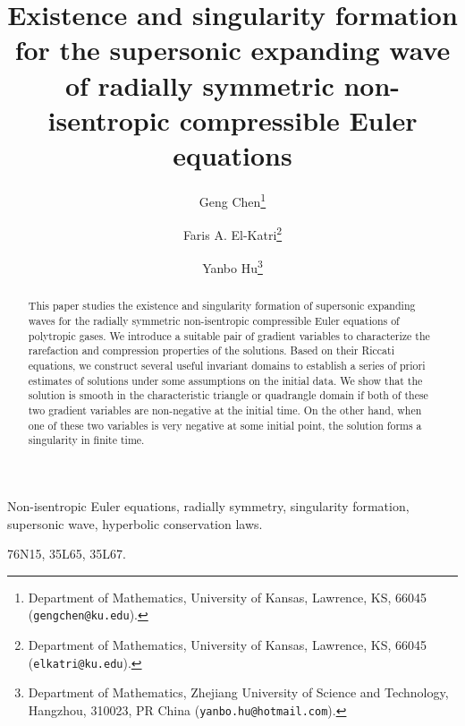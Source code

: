 \documentclass[11pt,reqno]{article}
\renewcommand{\thefootnote}{\ding{73}}
\numberwithin{equation}{section}
\begin{document}

\title{Existence and singularity formation for the supersonic expanding wave of radially symmetric non-isentropic compressible Euler equations}

\author{
Geng Chen\thanks{Department of Mathematics,
University of Kansas, Lawrence, KS,
66045 ({\tt gengchen@ku.edu}).}
\and
Faris A. El-Katri\thanks{Department of Mathematics,
University of Kansas, Lawrence, KS,
66045 ({\tt elkatri@ku.edu}).}
\and
Yanbo Hu\thanks{Department of Mathematics, Zhejiang University of Science and Technology, Hangzhou, 310023, PR China ({\tt yanbo.hu@hotmail.com}).}
}


\rnew{\thefootnote}{\fnsymbol{footnote}}



\date{}


\maketitle
\begin{abstract}
This paper studies the existence and singularity formation of supersonic expanding waves for the radially symmetric non-isentropic compressible Euler equations of polytropic gases. We introduce a suitable pair of gradient variables to characterize the rarefaction and compression properties of the solutions. Based on their Riccati equations, we construct several useful invariant domains to
establish a series of priori estimates of solutions under some assumptions on the initial data.
We show that the solution is smooth in the characteristic triangle or quadrangle domain if both of these two gradient variables are non-negative at the initial time. On the other hand, when one of these two variables is very negative at some initial point, the solution forms a
singularity in finite time.
\end{abstract}

\begin{keywords}
Non-isentropic Euler equations, radially symmetry, singularity formation, supersonic wave, hyperbolic conservation laws.
\end{keywords}

\begin{AMS}
76N15, 35L65, 35L67.
\end{AMS}


\end{document}
